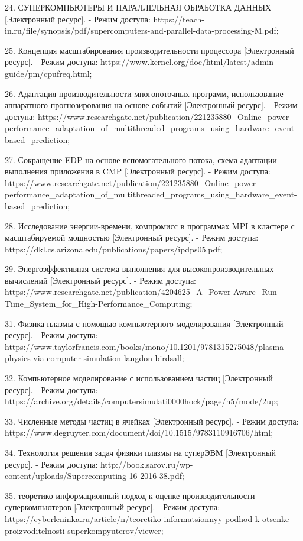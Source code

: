 \documentclass{article}
\begin{document}
24. СУПЕРКОМПЬЮТЕРЫ И ПАРАЛЛЕЛЬНАЯ ОБРАБОТКА ДАННЫХ [Электронный ресурс].
   - Режим доступа: https://teach-in.ru/file/synopsis/pdf/supercomputers-and-parallel-data-processing-M.pdf;

25. Концепция масштабирования производительности процессора [Электронный ресурс].
   - Режим доступа: https://www.kernel.org/doc/html/latest/admin-guide/pm/cpufreq.html;

26. Адаптация производительности многопоточных программ, использование аппаратного прогнозирования на основе событий [Электронный ресурс].
   - Режим доступа: https://www.researchgate.net/publication/221235880_Online_power-performance_adaptation_of_multithreaded_programs_using_hardware_event-based_prediction;

27. Сокращение EDP на основе вспомогательного потока, схема адаптации выполнения приложения в CMP [Электронный ресурс].
   - Режим доступа: https://www.researchgate.net/publication/221235880_Online_power-performance_adaptation_of_multithreaded_programs_using_hardware_event-based_prediction;

28. Исследование энергии-времени, компромисс в программах MPI в кластере с масштабируемой мощностью [Электронный ресурс].
   - Режим доступа: https://dkl.cs.arizona.edu/publications/papers/ipdps05.pdf;

29. Энергоэффективная система выполнения для высокопроизводительных вычислений [Электронный ресурс].
   - Режим доступа: https://www.researchgate.net/publication/4204625_A_Power-Aware_Run-Time_System_for_High-Performance_Computing;

31. Физика плазмы с помощью компьютерного моделирования [Электронный ресурс].
   - Режим доступа: https://www.taylorfrancis.com/books/mono/10.1201/9781315275048/plasma-physics-via-computer-simulation-langdon-birdsall;

32. Компьютерное моделирование с использованием частиц [Электронный ресурс].
   - Режим доступа: https://archive.org/details/computersimulati0000hock/page/n5/mode/2up;

33. Численные методы частиц в ячейках [Электронный ресурс].
   - Режим доступа: https://www.degruyter.com/document/doi/10.1515/9783110916706/html;

34. Технология решения задач физики плазмы на суперЭВМ [Электронный ресурс].
   - Режим доступа: http://book.sarov.ru/wp-content/uploads/Supercomputing-16-2016-38.pdf;

35. теоретико-информационный подход к оценке производительности суперкомпьютеров [Электронный ресурс].
   - Режим доступа: https://cyberleninka.ru/article/n/teoretiko-informatsionnyy-podhod-k-otsenke-proizvoditelnosti-superkompyuterov/viewer;
\end{document}
